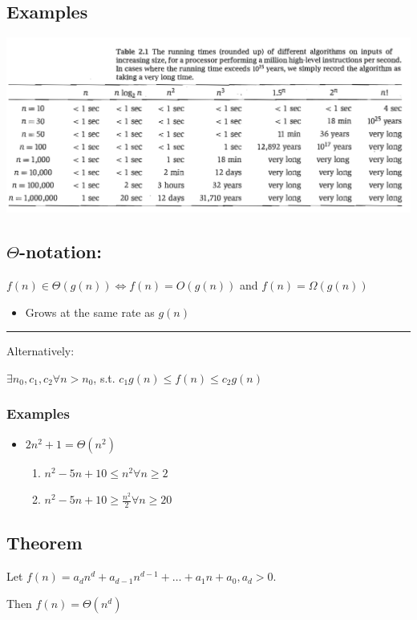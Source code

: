 \documentclass[11pt]{article}
\begin{document}
\subsection{Examples}
\label{sec:org986c702}
\begin{center}
\includegraphics[width=.9\linewidth]{./Images/i6.jpg}
\end{center}
\subsection{\(\Theta\)-notation:}
\label{sec:orgd6d8ad1}
\(f(n) \in \Theta (g(n)) \iff f(n) = O(g(n))\) and \(f(n)=\Omega(g(n))\)
\begin{itemize}
\item Grows at the same rate as \(g(n)\)
\end{itemize}

\noindent\rule{\textwidth}{0.5pt}
Alternatively:

\(\exists n_0, c_1, c_2 \forall n>n_0\), s.t. \(c_1g(n)\leq f(n) \leq c_2 g(n)\)
\subsubsection{Examples}
\label{sec:org1545ee7}
\begin{itemize}
\item \(2n^2+1 = \Theta(n^2)\)
\begin{enumerate}
\item \(n^2-5n+10 \leq n^2 \forall n \geq 2\)
\item \(n^2-5n+10 \geq \frac{n^2}{2} \forall n \geq 20\)
\end{enumerate}
\end{itemize}
\subsection{Theorem}
\label{sec:orgf3d4c8f}
Let \(f(n)=a_d n^d + a_{d-1}n^{d-1}+\ldots+a_1 n + a_0, a_d>0\).

Then \(f(n)=\Theta(n^d)\)
\end{document}
